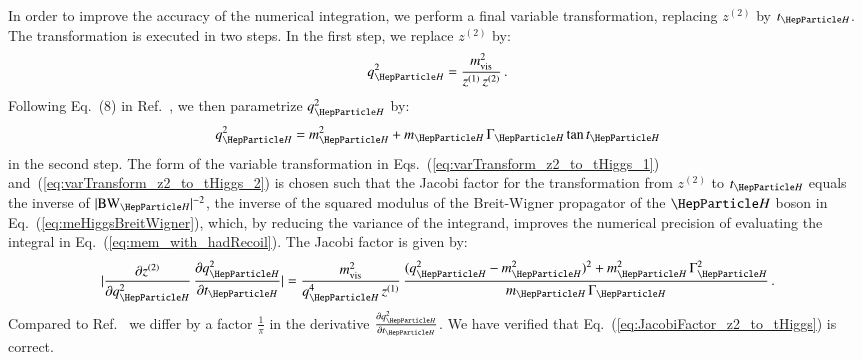 In order to improve the accuracy of the numerical integration,
we perform a final variable transformation, replacing $z^{(2)}$ by $t_{\PHiggs}$.
The transformation is executed in two steps. 
In the first step, we replace $z^{(2)}$ by:
\begin{equation}
q_{\PHiggs}^{2} = \frac{m^{2}_{\vis}}{z^{(1)} \, z^{(2)}} \, .
\label{eq:varTransform_z2_to_tHiggs_1}
\end{equation}
Following Eq.~(8) in Ref.~\cite{Alwall:2010cq}, we then parametrize $q_{\PHiggs}^{2}$ by:
\begin{equation}
q_{\PHiggs}^{2} = m_{\PHiggs}^{2} + m_{\PHiggs} \, \Gamma_{\PHiggs}
\tan t_{\PHiggs} 
\label{eq:varTransform_z2_to_tHiggs_2}
\end{equation}
in the second step.
The form of the variable transformation in Eqs.~(\ref{eq:varTransform_z2_to_tHiggs_1}) and~(\ref{eq:varTransform_z2_to_tHiggs_2}) 
is chosen such that the Jacobi factor for the transformation from
$z^{(2)}$ to $t_{\PHiggs}$ equals the inverse of $\vert \BW_{\PHiggs}
\vert^{-2}$, the inverse of the squared modulus
of the Breit-Wigner propagator of the $\PHiggs$ boson in
Eq.~(\ref{eq:meHiggsBreitWigner}),
which, by reducing the variance of the integrand,
improves the numerical precision of evaluating the integral 
in Eq.~(\ref{eq:mem_with_hadRecoil}).
The Jacobi factor is given by:
\begin{equation}
\lvert \frac{\partial z^{(2)}}{\partial q_{\PHiggs}^{2}} \, \frac{\partial
  q_{\PHiggs}^{2}}{\partial t_{\PHiggs}} \rvert =
\frac{m^{2}_{\vis}}{q_{\PHiggs}^{4} \, z^{(1)}} \, \frac{(q_{\PHiggs}^{2}
  - m_{\PHiggs}^{2})^{2} + m_{\PHiggs}^{2} \,
  \Gamma_{\PHiggs}^{2}}{m_{\PHiggs} \, \Gamma_{\PHiggs}} \, .
\label{eq:JacobiFactor_z2_to_tHiggs}  
\end{equation}
Compared to Ref.~\cite{Alwall:2010cq} we differ by a factor $\frac{1}{\pi}$ in the derivative 
$\frac{\partial q_{\PHiggs}^{2}}{\partial t_{\PHiggs}}$. We have verified that Eq.~(\ref{eq:JacobiFactor_z2_to_tHiggs}) is correct.

